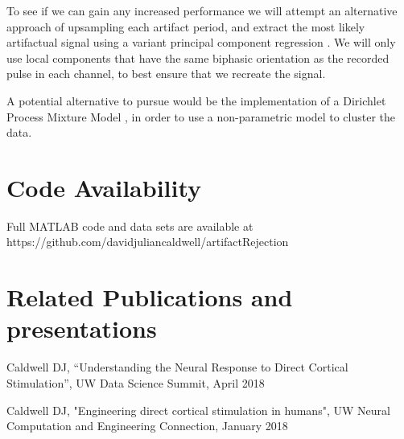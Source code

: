 To see if we can gain any increased performance we will attempt an alternative approach of upsampling each artifact period, and extract the most likely artifactual signal using a variant principal component regression \cite{OShea2017}. We will only use local components that have the same biphasic orientation as the recorded pulse in each channel, to best ensure that we recreate the signal. 

A potential alternative to pursue would be the implementation of a Dirichlet Process Mixture Model \cite{Teh2010, Teh2006}, in order to use a non-parametric model to cluster the data. 

\section{Code Availability}

Full MATLAB code and data sets are available at https://github.com/davidjuliancaldwell/artifactRejection 

\section{Related Publications and presentations}

\noindent Caldwell DJ, “Understanding the Neural Response to Direct Cortical Stimulation”, UW Data Science Summit, April 2018 \\ 
\medskip

\noindent Caldwell DJ, "Engineering direct cortical stimulation in humans", UW Neural Computation and Engineering Connection, January 2018 \\ 
\medskip
